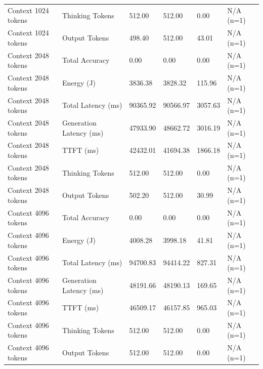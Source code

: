 \begin{table}
\begin{tabular}{llllll}
Context 1024 tokens & Thinking Tokens & 512.00 & 512.00 & 0.00 & N/A (n=1) \\
Context 1024 tokens & Output Tokens & 498.40 & 512.00 & 43.01 & N/A (n=1) \\
Context 2048 tokens & Total Accuracy & 0.00 & 0.00 & 0.00 & N/A (n=1) \\
Context 2048 tokens & Energy (J) & 3836.38 & 3828.32 & 115.96 & N/A (n=1) \\
Context 2048 tokens & Total Latency (ms) & 90365.92 & 90566.97 & 3057.63 & N/A (n=1) \\
Context 2048 tokens & Generation Latency (ms) & 47933.90 & 48662.72 & 3016.19 & N/A (n=1) \\
Context 2048 tokens & TTFT (ms) & 42432.01 & 41694.38 & 1866.18 & N/A (n=1) \\
Context 2048 tokens & Thinking Tokens & 512.00 & 512.00 & 0.00 & N/A (n=1) \\
Context 2048 tokens & Output Tokens & 502.20 & 512.00 & 30.99 & N/A (n=1) \\
Context 4096 tokens & Total Accuracy & 0.00 & 0.00 & 0.00 & N/A (n=1) \\
Context 4096 tokens & Energy (J) & 4008.28 & 3998.18 & 41.81 & N/A (n=1) \\
Context 4096 tokens & Total Latency (ms) & 94700.83 & 94414.22 & 827.31 & N/A (n=1) \\
Context 4096 tokens & Generation Latency (ms) & 48191.66 & 48190.13 & 169.65 & N/A (n=1) \\
Context 4096 tokens & TTFT (ms) & 46509.17 & 46157.85 & 965.03 & N/A (n=1) \\
Context 4096 tokens & Thinking Tokens & 512.00 & 512.00 & 0.00 & N/A (n=1) \\
Context 4096 tokens & Output Tokens & 512.00 & 512.00 & 0.00 & N/A (n=1) \\
\bottomrule
\end{tabular}
\end{table}
